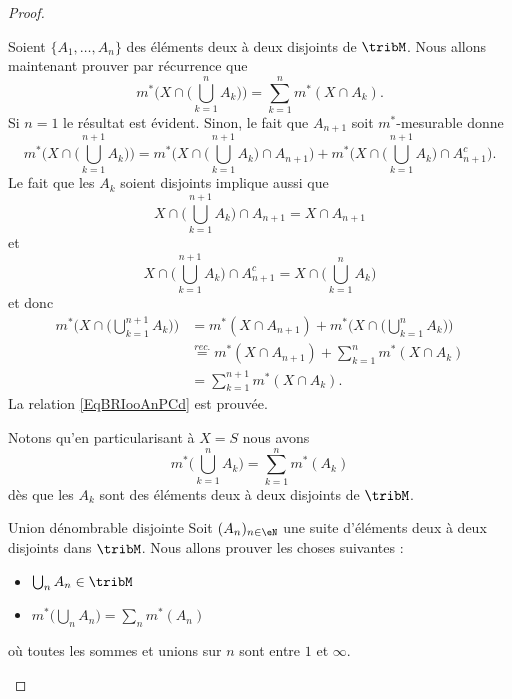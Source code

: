 \begin{proof}
\begin{subproof}
        Soient \( \{ A_1,\ldots, A_n \}\) des éléments deux à deux disjoints de \( \tribM\). Nous allons maintenant prouver par récurrence que
        \begin{equation}    \label{EqBRIooAnPCd}
            m^*\Big( X\cap\big( \bigcup_{k=1}^nA_k \big) \Big)=\sum_{k=1}^nm^*(X\cap A_k).
        \end{equation}
        Si \( n=1\) le résultat est évident. Sinon, le fait que \( A_{n+1}\) soit \( m^*\)-mesurable donne
        \begin{equation}
            m^*\Big( X\cap\big( \bigcup_{k=1}^{n+1}A_k \big) \Big)=m^*\Big( X\cap\big( \bigcup_{k=1}^{n+1}A_k \big)\cap A_{n+1} \Big)+m^*\Big( X\cap\big( \bigcup_{k=1}^{n+1}A_k \big)\cap A_{n+1}^c \Big).
        \end{equation}
        Le fait que les \( A_k\) soient disjoints implique aussi que
        \begin{equation}
            X\cap\big( \bigcup_{k=1}^{n+1}A_k \big)\cap A_{n+1}=X\cap A_{n+1}
        \end{equation}
        et
        \begin{equation}
            X\cap\big( \bigcup_{k=1}^{n+1}A_k \big)\cap A_{n+1}^c=X\cap\big( \bigcup_{k=1}^nA_k \big)
        \end{equation}
        et donc
        \begin{subequations}
            \begin{align}
                m^*\Big( X\cap\big( \bigcup_{k=1}^{n+1}A_k \big) \Big) & =m^*(X\cap A_{n+1})+m^*\Big( X\cap\big( \bigcup_{k=1}^nA_k \big) \Big)       \\
                & \stackrel{rec.}{=}m^*(X\cap A_{n+1})+\sum_{k=1}^nm^*(X\cap A_k)         \\
                & =\sum_{k=1}^{n+1}m^*(X\cap A_k).
            \end{align}
        \end{subequations}
        La relation \eqref{EqBRIooAnPCd} est prouvée.

        Notons qu'en particularisant à \( X=S\) nous avons
        \begin{equation}
            m^*\big( \bigcup_{k=1}^nA_k \big)=\sum_{k=1}^nm^*(A_k)
        \end{equation}
        dès que les \( A_k\) sont des éléments deux à deux disjoints de \( \tribM\).

    \item[Union dénombrable disjointe]
        Soit \( (A_n)_{n\in \eN}\) une suite d'éléments deux à deux disjoints dans \( \tribM\). Nous allons prouver les choses suivantes :
        \begin{itemize}
            \item \( \bigcup_nA_n\in\tribM\)
            \item \( m^*\big( \bigcup_nA_n \big)=\sum_nm^*(A_n)\)
        \end{itemize}
        où toutes les sommes et unions sur \( n\) sont entre \( 1\) et \( \infty\).


\end{subproof}
\end{proof}
